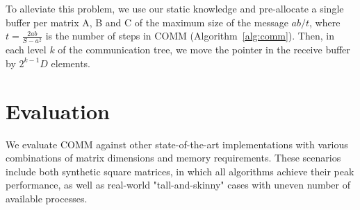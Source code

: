\documentclass[sigplan,review,anonymous]{acmart}\settopmatter{printfolios=true,printccs=false,printacmref=false}
\newcommand\greg[1]{\textcolor{blue}{[Greg: #1]}}
\begin{document}
To alleviate this problem, we use our static knowledge and pre-allocate a 
single buffer per matrix A, B and C of the maximum size of the message $ab/t$, 
where $t = \frac{2ab}{S - a^2}$ is the number of steps in COMM 
(Algorithm~\ref{alg:comm}). Then, in each level $k$ of the communication tree, 
we  move the pointer in the receive buffer by $2^{k-1} D$ elements.

%

\section{Evaluation}
\label{sec:evaluation}

We evaluate COMM against other state-of-the-art implementations with various 
combinations of matrix dimensions and memory requirements. These scenarios 
include both synthetic square matrices, in which all algorithms achieve their 
peak performance, as well as real-world "tall-and-skinny" cases with uneven 
number of available processes. 
 
\end{document}
